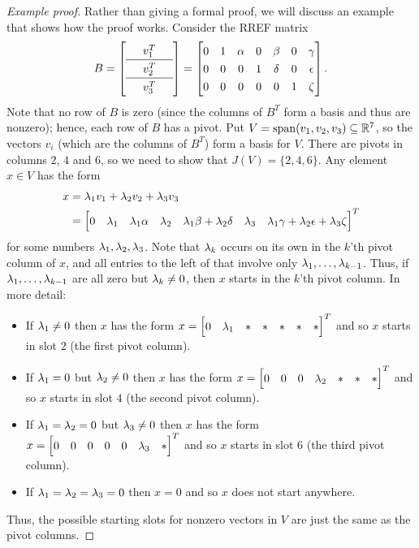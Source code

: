 \documentclass[reqno]{amsart}
\theoremstyle{definition}
\begin{document}
\begin{proof}[Example proof]
 Rather than giving a formal proof, we will discuss an example that
 shows how the proof works.  Consider the RREF matrix
 \[ {\renewcommand{\arraystretch}{1.3}
    B = \left[\begin{array}{ccc}
          & v_1^T & \\ \hline
          & v_2^T & \\ \hline
          & v_3^T &
        \end{array}\right]}
     =
    \bbm
     0 & 1 & \al & 0 & \bt & 0 & \gm \\
     0 & 0 &  0  & 1 & \dl & 0 & \ep \\
     0 & 0 &  0  & 0 &  0  & 1 & \zt
    \ebm.
 \]
 Note that no row of $B$ is zero (since the columns of $B^T$
 form a basis and thus are nonzero); hence, each row of $B$ has
 a pivot.
 Put $V=\operatorname{span}(v_1,v_2,v_3)\subseteq{\mathbb{R}}^7$, so the vectors $v_i$ (which are
 the columns of $B^T$) form a basis for $V$.  There are pivots in
 columns $2$, $4$ and $6$, so we need to show that $J(V)=\{2,4,6\}$.
 Any element $x\in V$ has the form
 \begin{align*}
  x &= \lm_1v_1+\lm_2v_2+\lm_3v_3 \\
    &= \bbm 0 & \lm_1 & \lm_1\al & \lm_2 &
            \lm_1\bt+\lm_2\dl & \lm_3 &
            \lm_1\gm+\lm_2\ep+\lm_3\zt \ebm^T
 \end{align*}
 for some numbers $\lambda_1, \lambda_2, \lambda_3$.
 Note that $\lambda_k$ occurs on its own in the $k$'th pivot column of
 $x$, and all entries to the left of that involve only
 $\lambda_1,\dotsc,\lambda_{k-1}$.  Thus, if $\lambda_1,\dotsc,\lambda_{k-1}$ are all
 zero but $\lambda_k\neq 0$, then $x$ starts in the $k$'th pivot column.
 In more detail:
 \begin{itemize}
  \item If $\lambda_1\neq 0$ then $x$ has the form
   $x=\bbm 0&\lm_1&*&*&*&*&*\ebm^T$ and so $x$ starts in slot $2$ (the
   first pivot column).
  \item If $\lambda_1=0$ but $\lambda_2\neq 0$ then $x$ has the form
   $x=\bbm 0&0&0&\lm_2&*&*&*\ebm^T$ and so $x$ starts in slot $4$ (the
   second pivot column).
  \item If $\lambda_1=\lambda_2=0$ but $\lambda_3\neq 0$ then $x$ has the form
   $x=\bbm 0&0&0&0&0&\lm_3&*\ebm^T$ and so $x$ starts in slot $6$ (the
   third pivot column).
  \item If $\lambda_1=\lambda_2=\lambda_3=0$ then $x=0$ and so $x$ does not start
   anywhere.
 \end{itemize}
 Thus, the possible starting slots for nonzero vectors in $V$ are just
 the same as the pivot columns.
\end{proof}
\end{document}
